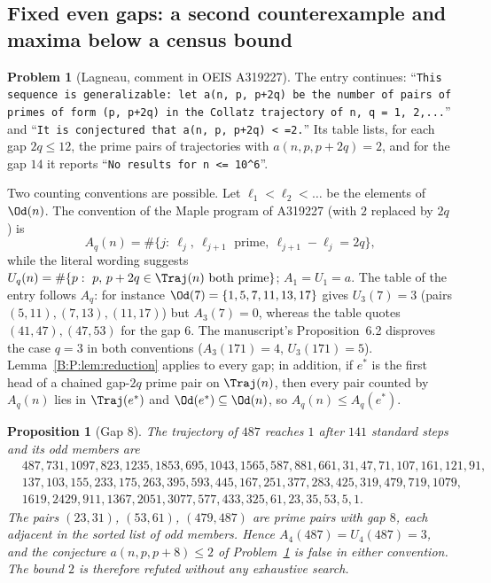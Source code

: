 \documentclass[11pt,a4paper]{article}
\newtheorem{proposition}[theorem]{Proposition}
\theoremstyle{definition}
\newtheorem{problem}[theorem]{Problem}
\theoremstyle{remark}
\numberwithin{equation}{section}
\begin{document}
\subsection{Fixed even gaps: a second counterexample and maxima below a census bound}

\begin{problem}[Lagneau, comment in OEIS A319227]\label{B:P:prob:gaps}
The entry \cite{R009} continues: ``\texttt{This sequence is generalizable: let
a(n, p, p+2q) be the number of pairs of primes of form (p, p+2q) in the Collatz
trajectory of n, q = 1, 2,...}'' and ``\texttt{It is conjectured that a(n, p, p+2q)
< =2.}'' Its table lists, for each gap $2q\le12$, the prime pairs of
trajectories with $a(n,p,p+2q)=2$, and for the gap $14$ it reports
``\texttt{No results for n <= 10\^{}6}''.
\end{problem}

Two counting conventions are possible. Let $\ell_1<\ell_2<\dots$ be the
elements of $\Od(n)$. The convention of the Maple program of A319227 (with $2$
replaced by $2q$) is
\[
A_q(n)=\#\{j:\ \ell_j,\ \ell_{j+1}\text{ prime},\ \ell_{j+1}-\ell_j=2q\},
\]
while the literal wording suggests
$U_q(n)=\#\{p:\ p,\,p+2q\in\Traj(n)\text{ both prime}\}$; $A_1=U_1=a$.
The table of the entry follows $A_q$: for instance
$\Od(7)=\{1,5,7,11,13,17\}$ gives $U_3(7)=3$ (pairs $(5,11),(7,13),(11,17)$)
but $A_3(7)=0$, whereas the table quotes $(41,47),(47,53)$ for the gap $6$.
The manuscript's Proposition~6.2 \cite{R021} disproves the case $q=3$ in both
conventions ($A_3(171)=4$, $U_3(171)=5$). Lemma~\ref{B:P:lem:reduction} applies
to every gap; in addition, if $e^*$ is the first head of a chained gap-$2q$
prime pair on $\Traj(n)$, then every pair counted by $A_q(n)$ lies in
$\Traj(e^*)$ and $\Od(e^*)\subseteq\Od(n)$, so $A_q(n)\le A_q(e^*)$.

\begin{proposition}[Gap $8$]\label{B:P:prop:gap8}
The trajectory of $487$ reaches $1$ after $141$ standard steps and its odd
members are
\begin{align*}
&487,731,1097,823,1235,1853,695,1043,1565,587,881,661,31,47,71,107,161,121,91,\\
&137,103,155,233,175,263,395,593,445,167,251,377,283,425,319,479,719,1079,\\
&1619,2429,911,1367,2051,3077,577,433,325,61,23,35,53,5,1.
\end{align*}
The pairs $(23,31)$, $(53,61)$, $(479,487)$ are prime pairs with gap $8$, each
adjacent in the sorted list of odd members. Hence
$A_4(487)=U_4(487)=3$, and the conjecture $a(n,p,p+8)\le2$ of
Problem~\ref{B:P:prob:gaps} is false in either convention. The bound $2$ is therefore refuted without any exhaustive search.
\end{proposition}
\end{document}
